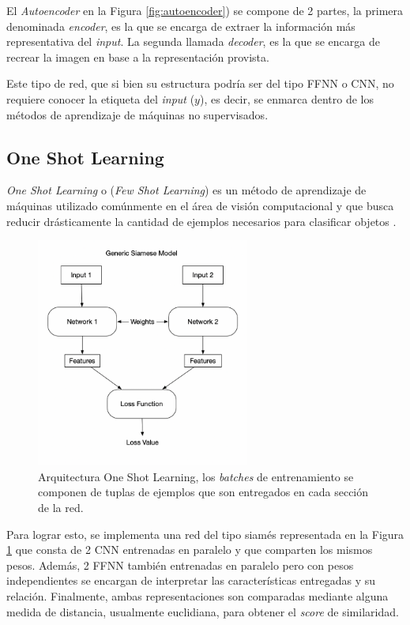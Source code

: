 El \textit{Autoencoder} en la Figura \ref{fig:autoencoder}) se compone de 2 partes, la primera denominada \textit{encoder}, es la que se encarga de extraer la información más representativa del \textit{input}. La segunda llamada \textit{decoder}, es la que se encarga de recrear la imagen en base a la representación provista. 

\vspace{0.2cm}

Este tipo de red, que si bien su estructura podría ser del tipo FFNN o CNN, no requiere conocer la etiqueta del \textit{input} ($y$), es decir, se enmarca dentro de los métodos de aprendizaje de máquinas no supervisados. 

\subsection{One Shot Learning}

\textit{One Shot Learning} o (\textit{Few Shot Learning}) es un método de aprendizaje de máquinas utilizado comúnmente en el área de visión computacional y que busca reducir drásticamente la cantidad de ejemplos necesarios para clasificar objetos \cite{OMAHONY2019186}.

\begin{figure}[ht]
    \centering
    \includegraphics[width=7cm]{img/tesis/siamese.png}
    \caption{Arquitectura One Shot Learning, los \textit{batches} de entrenamiento se componen de tuplas de ejemplos que son entregados en cada sección de la red.}
    \label{fig:oneshot}
\end{figure}


Para lograr esto, se implementa una red del tipo siamés representada en la Figura \ref{fig:oneshot} que consta de 2 CNN entrenadas en paralelo y que comparten los mismos pesos. Además, 2 FFNN también entrenadas en paralelo pero con pesos independientes se encargan de interpretar las características entregadas y su relación. Finalmente, ambas representaciones son comparadas mediante alguna medida de distancia, usualmente euclidiana, para obtener el \textit{score} de similaridad. 

